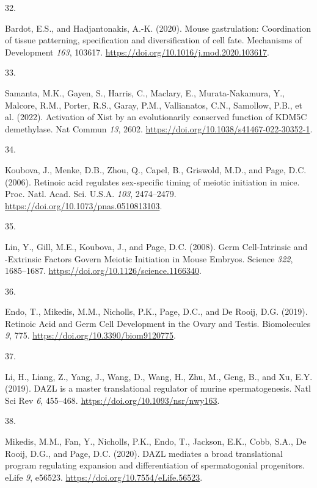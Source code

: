 \documentclass[
]{article}
\newlength{\cslhangindent}
\newlength{\csllabelwidth}
\newlength{\cslentryspacingunit} %
\newenvironment{CSLReferences}[2] %
 {%
  \setlength{\parindent}{0pt}
  \ifodd #1
  \let\oldpar\par
  \def\par{\hangindent=\cslhangindent\oldpar}
  \fi
  \setlength{\parskip}{#2\cslentryspacingunit}
 }%
 {}
\newcommand{\CSLLeftMargin}[1]{\parbox[t]{\csllabelwidth}{#1}}
\newcommand{\CSLRightInline}[1]{\parbox[t]{\linewidth - \csllabelwidth}{#1}\break}
\begin{document}
\begin{CSLReferences}{0}{0}
\leavevmode{}%
\CSLLeftMargin{32. }%
\CSLRightInline{Bardot, E.S., and Hadjantonakis, A.-K. (2020). Mouse
gastrulation: {Coordination} of tissue patterning, specification and
diversification of cell fate. Mechanisms of Development \emph{163},
103617. \url{https://doi.org/10.1016/j.mod.2020.103617}.}

\leavevmode{}%
\CSLLeftMargin{33. }%
\CSLRightInline{Samanta, M.K., Gayen, S., Harris, C., Maclary, E.,
Murata-Nakamura, Y., Malcore, R.M., Porter, R.S., Garay, P.M.,
Vallianatos, C.N., Samollow, P.B., et al. (2022). Activation of {Xist}
by an evolutionarily conserved function of {KDM5C} demethylase. Nat
Commun \emph{13}, 2602.
\url{https://doi.org/10.1038/s41467-022-30352-1}.}

\leavevmode{}%
\CSLLeftMargin{34. }%
\CSLRightInline{Koubova, J., Menke, D.B., Zhou, Q., Capel, B., Griswold,
M.D., and Page, D.C. (2006). Retinoic acid regulates sex-specific timing
of meiotic initiation in mice. Proc. Natl. Acad. Sci. U.S.A. \emph{103},
2474--2479. \url{https://doi.org/10.1073/pnas.0510813103}.}

\leavevmode{}%
\CSLLeftMargin{35. }%
\CSLRightInline{Lin, Y., Gill, M.E., Koubova, J., and Page, D.C. (2008).
Germ {Cell-Intrinsic} and -{Extrinsic Factors Govern Meiotic Initiation}
in {Mouse Embryos}. Science \emph{322}, 1685--1687.
\url{https://doi.org/10.1126/science.1166340}.}

\leavevmode{}%
\CSLLeftMargin{36. }%
\CSLRightInline{Endo, T., Mikedis, M.M., Nicholls, P.K., Page, D.C., and
De Rooij, D.G. (2019). Retinoic {Acid} and {Germ Cell Development} in
the {Ovary} and {Testis}. Biomolecules \emph{9}, 775.
\url{https://doi.org/10.3390/biom9120775}.}

\leavevmode{}%
\CSLLeftMargin{37. }%
\CSLRightInline{Li, H., Liang, Z., Yang, J., Wang, D., Wang, H., Zhu,
M., Geng, B., and Xu, E.Y. (2019). {DAZL} is a master translational
regulator of murine spermatogenesis. Natl Sci Rev \emph{6}, 455--468.
\url{https://doi.org/10.1093/nsr/nwy163}.}

\leavevmode{}%
\CSLLeftMargin{38. }%
\CSLRightInline{Mikedis, M.M., Fan, Y., Nicholls, P.K., Endo, T.,
Jackson, E.K., Cobb, S.A., De Rooij, D.G., and Page, D.C. (2020). {DAZL}
mediates a broad translational program regulating expansion and
differentiation of spermatogonial progenitors. eLife \emph{9}, e56523.
\url{https://doi.org/10.7554/eLife.56523}.}


\end{CSLReferences}
\end{document}
